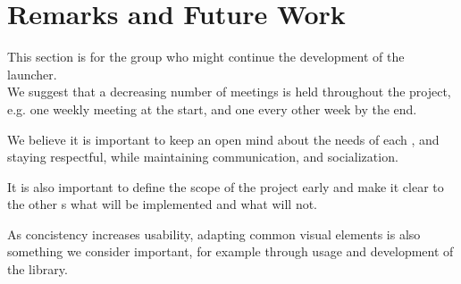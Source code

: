 \section{Remarks and Future Work}
\label{epi:remarks}
This section is for the group who might continue the development of the \giraf[] launcher. \\

We suggest that a decreasing number of meetings is held throughout the project, e.g. one weekly meeting at the start, and one every other week by the end.

We believe it is important to keep an open mind about the needs of each \localgroup[], and staying respectful, while maintaining communication, and socialization.

It is also important to define the scope of the project early and make it clear to the other \localgroup[]s what will be implemented and what will not.

As concistency increases usability, adapting common visual elements is also something we consider important, for example through usage and development of the \guicomponents[] library.
